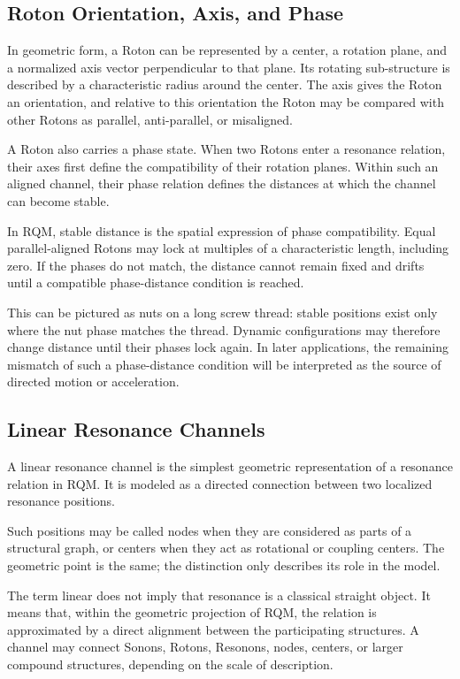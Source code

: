 \documentclass[11pt,a4paper]{article}
\begin{document}
\subsection{Roton Orientation, Axis, and Phase}

In geometric form, a Roton can be represented by a center, a rotation plane, and a normalized axis vector perpendicular to that plane. Its rotating sub-structure is described by a characteristic radius around the center. The axis gives the Roton an orientation, and relative to this orientation the Roton may be compared with other Rotons as parallel, anti-parallel, or misaligned.

A Roton also carries a phase state. When two Rotons enter a resonance relation, their axes first define the compatibility of their rotation planes. Within such an aligned channel, their phase relation defines the distances at which the channel can become stable.

In RQM, stable distance is the spatial expression of phase compatibility. Equal parallel-aligned Rotons may lock at multiples of a characteristic length, including zero. If the phases do not match, the distance cannot remain fixed and drifts until a compatible phase-distance condition is reached.

This can be pictured as nuts on a long screw thread: stable positions exist only where the nut phase matches the thread. Dynamic configurations may therefore change distance until their phases lock again. In later applications, the remaining mismatch of such a phase-distance condition will be interpreted as the source of directed motion or acceleration.


\subsection{Linear Resonance Channels}

A linear resonance channel is the simplest geometric representation of a resonance relation in RQM. It is modeled as a directed connection between two localized resonance positions.

Such positions may be called nodes when they are considered as parts of a structural graph, or centers when they act as rotational or coupling centers. The geometric point is the same; the distinction only describes its role in the model.

The term linear does not imply that resonance is a classical straight object. It means that, within the geometric projection of RQM, the relation is approximated by a direct alignment between the participating structures. A channel may connect Sonons, Rotons, Resonons, nodes, centers, or larger compound structures, depending on the scale of description.
\end{document}
